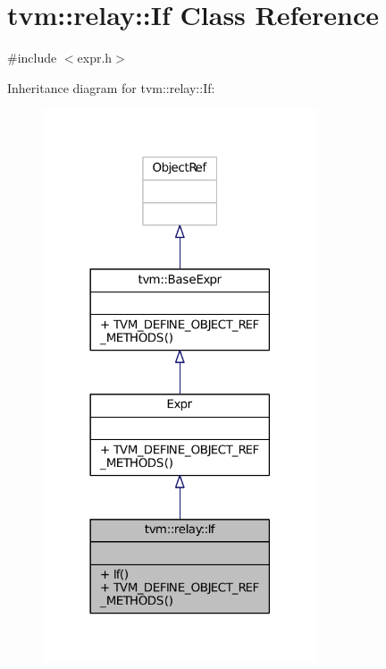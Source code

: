 \hypertarget{classtvm_1_1relay_1_1If}{}\section{tvm\+:\+:relay\+:\+:If Class Reference}
\label{classtvm_1_1relay_1_1If}


{\ttfamily \#include $<$expr.\+h$>$}



Inheritance diagram for tvm\+:\+:relay\+:\+:If\+:
\nopagebreak
\begin{figure}[H]
\begin{center}
\leavevmode
\includegraphics[width=230pt]{classtvm_1_1relay_1_1If__inherit__graph}
\end{center}
\end{figure}


